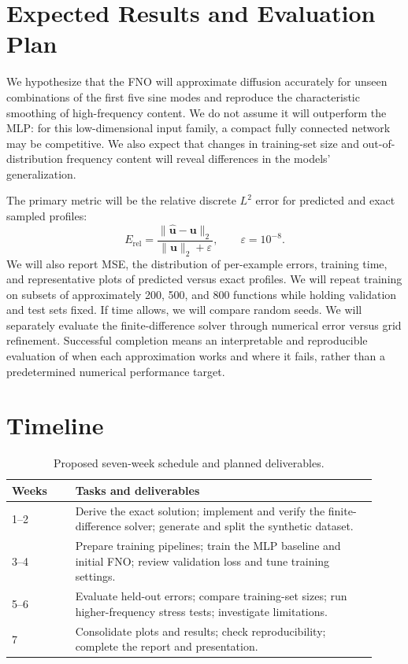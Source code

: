 \documentclass{article}
\begin{document}
\section{Expected Results and Evaluation Plan}
We hypothesize that the FNO will approximate diffusion accurately for unseen combinations of the first five sine modes and reproduce the characteristic smoothing of high-frequency content. We do not assume it will outperform the MLP: for this low-dimensional input family, a compact fully connected network may be competitive. We also expect that changes in training-set size and out-of-distribution frequency content will reveal differences in the models' generalization.

The primary metric will be the relative discrete $L^2$ error for predicted and exact sampled profiles:
\begin{equation}
E_{\mathrm{rel}}=\frac{\lVert\widehat{\boldsymbol{u}}-\boldsymbol{u}\rVert_2}
{\lVert\boldsymbol{u}\rVert_2+\varepsilon},\qquad \varepsilon=10^{-8}.
\label{eq:error}
\end{equation}
We will also report MSE, the distribution of per-example errors, training time, and representative plots of predicted versus exact profiles. We will repeat training on subsets of approximately 200, 500, and 800 functions while holding validation and test sets fixed. If time allows, we will compare random seeds. We will separately evaluate the finite-difference solver through numerical error versus grid refinement. Successful completion means an interpretable and reproducible evaluation of when each approximation works and where it fails, rather than a predetermined numerical performance target.

\section{Timeline}
\begin{table}[h]
\centering
\caption{Proposed seven-week schedule and planned deliverables.}
\begin{tabular}{@{}p{0.16\linewidth}p{0.76\linewidth}@{}}
\toprule
\textbf{Weeks} & \textbf{Tasks and deliverables}\\
\midrule
1--2 & Derive the exact solution; implement and verify the finite-difference solver; generate and split the synthetic dataset.\\
3--4 & Prepare training pipelines; train the MLP baseline and initial FNO; review validation loss and tune training settings.\\
5--6 & Evaluate held-out errors; compare training-set sizes; run higher-frequency stress tests; investigate limitations.\\
7 & Consolidate plots and results; check reproducibility; complete the report and presentation.\\
\bottomrule
\end{tabular}
\label{tab:timeline}
\end{table}
\end{document}
